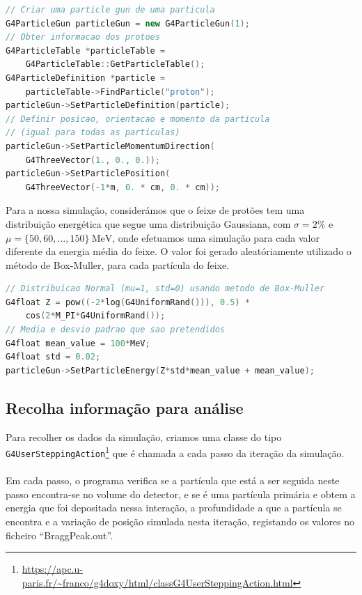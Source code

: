 \documentclass[a4paper, 12pt]{article} %
\begin{document}
	\begin{lstlisting}[language=C++]
// Criar uma particle gun de uma particula
G4ParticleGun particleGun = new G4ParticleGun(1);
// Obter informacao dos protoes
G4ParticleTable *particleTable = 
	G4ParticleTable::GetParticleTable();
G4ParticleDefinition *particle = 
	particleTable->FindParticle("proton");
particleGun->SetParticleDefinition(particle);
// Definir posicao, orientacao e momento da particula 
// (igual para todas as particulas)
particleGun->SetParticleMomentumDirection(
	G4ThreeVector(1., 0., 0.));
particleGun->SetParticlePosition(
	G4ThreeVector(-1*m, 0. * cm, 0. * cm));
	\end{lstlisting}

	Para a nossa simulação, considerámos que o feixe de protões tem uma distribuição energética que segue uma distribuição Gaussiana, com $\sigma=2\%$ e $\mu=\{50,60,\dots, 150\}\ \text{MeV}$, onde efetuamos uma simulação para cada valor diferente da energia média do feixe. O valor foi gerado aleatóriamente utilizado o método de Box-Muller, para cada partícula do feixe.

	\begin{lstlisting}[language=C++]
// Distribuicao Normal (mu=1, std=0) usando metodo de Box-Muller
G4float Z = pow((-2*log(G4UniformRand())), 0.5) * 
	cos(2*M_PI*G4UniformRand());
// Media e desvio padrao que sao pretendidos 
G4float mean_value = 100*MeV;
G4float std = 0.02;
particleGun->SetParticleEnergy(Z*std*mean_value + mean_value);
	\end{lstlisting}

	\subsection{Recolha informação para análise}
	Para recolher os dados da simulação, criamos uma classe do tipo \texttt{G4UserSteppingAction}\footnote{\url{https://apc.u-paris.fr/~franco/g4doxy/html/classG4UserSteppingAction.html}} que é chamada a cada passo da iteração da simulação.

	\paragraph{} Em cada passo, o programa verifica se a partícula que está a ser seguida neste passo encontra-se no volume do detector, e se é uma partícula primária e obtem a energia que foi depositada nessa interação, a profundidade a que a partícula se encontra e a variação de posição simulada nesta iteração, registando os valores no ficheiro ``BraggPeak.out''.
	
\end{document}
